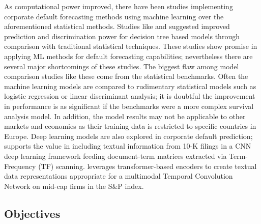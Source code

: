 \documentclass[10pt]{article}
\begin{document}
\begin{multicols*}{2}
As computational power improved, there have been studies implementing corporate default forecasting methods using machine learning over the aforementioned statistical methods. Studies like \citep{barboza} and \citep{sigrist} suggested improved prediction and discrimination power for decision tree based models through comparison with traditional statistical techniques. These studies show promise in applying ML methods for default forecasting capabilities; nevertheless there are several major shortcomings of these studies. 
The biggest flaw among model comparison studies like these come from the statistical benchmarks. Often the machine learning models are compared to rudimentary statistical models such as logistic regression or linear discriminant analysis; it is doubtful the improvement in performance is as significant if the benchmarks were a more complex survival analysis model. In addition, the model results may not be applicable to other markets and economies as their training data is restricted to specific countries in Europe.
Deep learning models are also explored in corporate default prediction; \citep{mai} supports the value in including textual information from 10-K filings in a CNN deep learning framework feeding document-term matrices extracted via Term-Frequency (TF) scanning. \citep{korangi} leverages transformer-based encoders to create textual data representations appropriate for a multimodal Temporal Convolution Network on mid-cap firms in the S\&P index. 

\subsection{Objectives}\label{objectives}


\end{multicols*}
\end{document}
